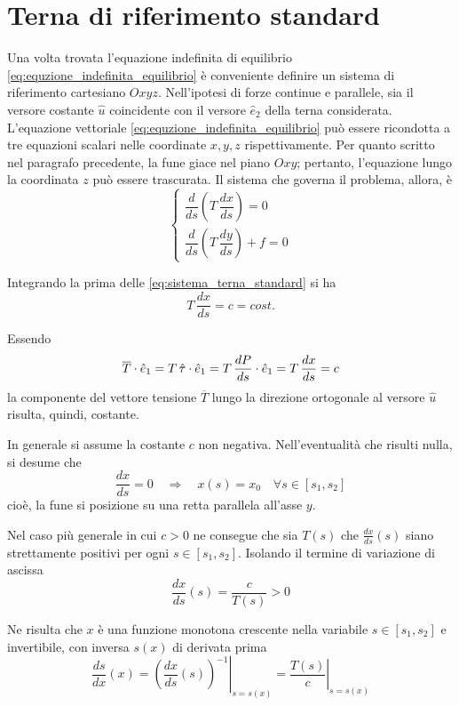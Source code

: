 \section{Terna di riferimento standard}
Una volta trovata l'equazione indefinita di equilibrio \eqref{eq:equzione_indefinita_equilibrio} è conveniente definire un sistema di riferimento cartesiano $Oxyz$. Nell'ipotesi di forze continue e parallele, sia il versore costante $\hat{u}$ coincidente con il versore $\hat{e}_2$ della terna considerata. 
L'equazione vettoriale \eqref{eq:equzione_indefinita_equilibrio} può essere ricondotta a tre equazioni scalari nelle coordinate $x, y, z$ rispettivamente. Per quanto scritto nel paragrafo precedente, la fune giace nel piano $Oxy$; pertanto, l'equazione lungo la coordinata $z$ può essere trascurata. Il sistema che governa il problema, allora, è
\begin{equation}
	\label{eq:sistema_terna_standard}
	\begin{cases}
		\dfrac{d}{ds}\left(T\,\dfrac{dx}{ds}\right) = 0\\[1.5ex]
		\dfrac{d}{ds}\left(T\,\dfrac{dy}{ds}\right) + f = 0
	\end{cases}
\end{equation}

Integrando la prima delle \eqref{eq:sistema_terna_standard} si ha
\begin{equation}
	\label{eq:tensione_direzione_x}
T\,\dfrac{dx}{ds} = c = cost.	
\end{equation}

Essendo
\[
\overline{T}\cdot\hat{e}_1	= T\,\hat{\tau}\cdot \hat{e}_1 = T\,\dfrac{dP}{ds}\cdot\hat{e}_1 = T\,\dfrac{dx}{ds} = c
\]
la componente del vettore tensione $\overline{T}$ lungo la direzione ortogonale al versore $\hat{u}$ risulta, quindi, costante. 

In generale si assume la costante $c$ non negativa. Nell'eventualità che risulti nulla, si desume che 
\[
\dfrac{dx}{ds} = 0	\quad \Longrightarrow \quad x(s) = x_0\quad \forall s\in[s_1, s_2]
\]  
cioè, la fune si posizione su una retta parallela all'asse $y$.

Nel caso più generale in cui $c>0$ ne consegue che sia $T(s)$ che $\frac{dx}{ds}(s)$ siano strettamente positivi per ogni $s\in[s_1, s_2]$. Isolando il termine di variazione di ascissa 
\[
\dfrac{dx}{ds}(s) = \dfrac{c}{T(s)}	> 0
\]

Ne risulta che $x$ è una funzione monotona crescente nella variabile $s\in[s_1, s_2]$ e invertibile, con inversa $s(x)$ di derivata prima
\[
\dfrac{ds}{dx}(x)	= \left.\left(\dfrac{dx}{ds}(s)\right)^{-1}\right|_{s=s(x)} = \left.\dfrac{T(s)}{c}\right|_{s=s(x)}
\]

